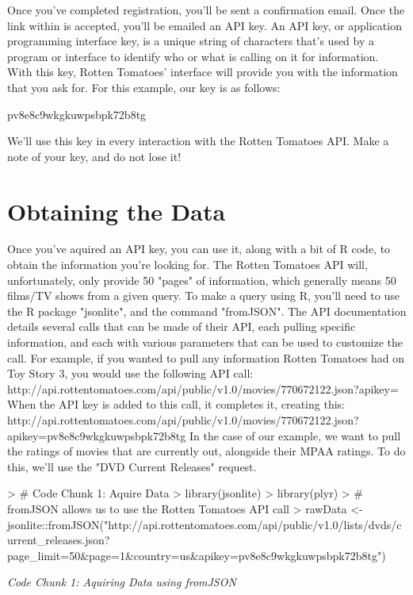 \documentclass{article}
\begin{document}
Once you've completed registration, you'll be sent a confirmation email. Once the link within is accepted, you'll be emailed an API key. An API key, or application programming interface key, is a unique string of characters that's used by a program or interface to identify who or what is calling on it for information. With this key, Rotten Tomatoes' interface will provide you with the information that you ask for. For this example, our key is as follows:

  pv8e8c9wkgkuwpsbpk72b8tg

We'll use this key in every interaction with the Rotten Tomatoes API. Make a note of your key, and do not lose it!

\section*{Obtaining the Data}
Once you've aquired an API key, you can use it, along with a bit of R code, to obtain the information you're looking for. The Rotten Tomatoes API will, unfortunately, only provide 50 "pages" of information, which generally means 50 films/TV shows from a given query. To make a query using R, you'll need to use the R package "jsonlite", and the command "fromJSON". 
The API documentation details several calls that can be made of their API, each pulling specific information, and each with various parameters that can be used to customize the call. For example, if you wanted to pull any information Rotten Tomatoes had on Toy Story 3, you would use the following API call: http://api.rottentomatoes.com/api/public/v1.0/movies/770672122.json?apikey=
When the API key is added to this call, it completes it, creating this: http://api.rottentomatoes.com/api/public/v1.0/movies/770672122.json?apikey=pv8e8c9wkgkuwpsbpk72b8tg
In the case of our example, we want to pull the ratings of movies that are currently out, alongside their MPAA ratings. To do this, we'll use the "DVD Current Releases" request.

\begin{Schunk}
\begin{Sinput}
> # Code Chunk 1: Aquire Data
> library(jsonlite)
> library(plyr) 
> # fromJSON allows us to use the Rotten Tomatoes API call
> rawData <- jsonlite::fromJSON("http://api.rottentomatoes.com/api/public/v1.0/lists/dvds/current_releases.json?page_limit=50&page=1&country=us&apikey=pv8e8c9wkgkuwpsbpk72b8tg")
\end{Sinput}
\end{Schunk}
\emph{Code Chunk 1: Aquiring Data using fromJSON}
\end{document}
